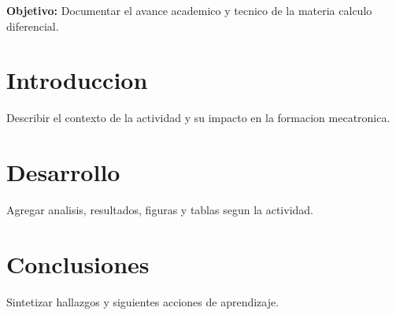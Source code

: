 \documentclass[spanish,letterpaper,oneside]{article}
\begin{document}
\templatePortrait
\templatePagecfg
\onehalfspacing

\begin{abstractd}
\textbf{Objetivo:} Documentar el avance academico y tecnico de la materia calculo diferencial.
\end{abstractd}

\templateIndex
\templateFinalcfg

\section{Introduccion}
Describir el contexto de la actividad y su impacto en la formacion mecatronica.

\section{Desarrollo}
Agregar analisis, resultados, figuras y tablas segun la actividad.

\section{Conclusiones}
Sintetizar hallazgos y siguientes acciones de aprendizaje.



\end{document}
